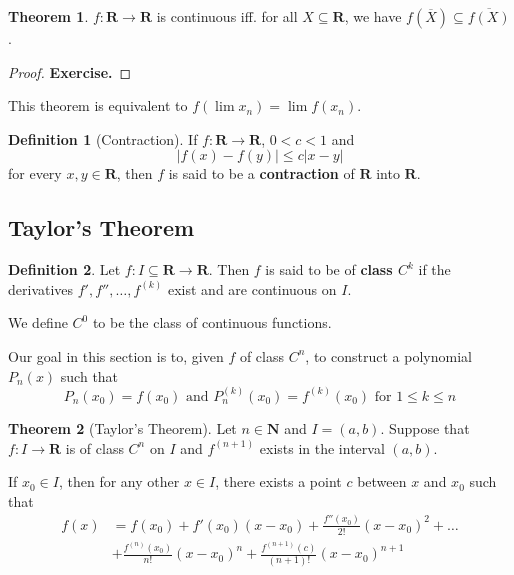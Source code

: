 \documentclass[tikz,12pt,a4paper]{article}
\theoremstyle{definition}
\newtheorem{theorem}{Theorem}[section]
\newtheorem{definition}{Definition}[section]
\begin{document}
\begin{theorem}
	$f : \textbf{R} \longrightarrow \textbf{R}$ is continuous iff. for all $X \subseteq \textbf{R}$, we have $f(\overline{X}) \subseteq \overline{f(X)}$.
\end{theorem}

\begin{proof}
	\textbf{Exercise.}
\end{proof}

This theorem is equivalent to $f (\lim x_n) = \lim f(x_n)$.

\begin{definition}[Contraction]
	If $f : \textbf{R} \longrightarrow \textbf{R}$, $0 < c < 1$ and
	\[
		| f(x) - f(y) | \leq c | x - y |
	\]
	for every $x, y \in \textbf{R}$, then $f$ is said to be a \textbf{contraction} of $\textbf{R}$ into $\textbf{R}$.
\end{definition}

\subsection{Taylor's Theorem}

\begin{definition}
	Let $f: I \subseteq \textbf{R} \longrightarrow \textbf{R}$. Then $f$ is said to be of \textbf{class $C^k$} if the derivatives $f', f'', \ldots, f^{(k)}$ exist and are continuous on $I$.

	We define $C^0$ to be the class of continuous functions.
\end{definition}

Our goal in this section is to, given $f$ of class $C^n$, to construct a polynomial $P_n(x)$ such that 
\[
	P_n(x_0) = f(x_0) \text{ and } P_n^{(k)}(x_0) = f^{(k)}(x_0) \text{ for } 1 \leq k \leq n
\]

\begin{theorem}[Taylor's Theorem]\label{thm:taylor}
	Let $n \in \textbf{N}$ and $I = (a,b)$. Suppose that $f : I \longrightarrow \textbf{R}$ is of class $C^n$ on $I$ and $f^{(n+1)}$ exists in the interval $(a,b)$.

	If $x_0 \in I$, then for any other $x \in I$, there exists a point $c$ between $x$ and $x_0$ such that
	\begin{equation*}
		\begin{aligned}
			f(x) &= f(x_0) + f'(x_0)(x-x_0) + \frac{f''(x_0)}{2!}(x - x_0)^2 + \ldots \\ &+ \frac{f^{(n)}(x_0)}{n!} (x-x_0)^n + \frac{f^{(n+1)}(c)}{(n+1)!} (x - x_0)^{n+1}
		\end{aligned}
	\end{equation*}
\end{theorem}
\end{document}
